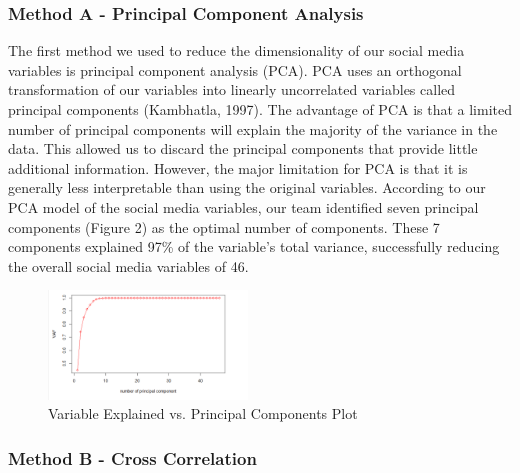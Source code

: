 \documentclass[12pt,oneside]{chicagocapstone}
\begin{document}
\hypertarget{method-a---principal-component-analysis}{%
\subsubsection*{Method A - Principal Component Analysis}\label{method-a---principal-component-analysis}}

The first method we used to reduce the dimensionality of our social media variables is principal component analysis (PCA). PCA uses an orthogonal transformation of our variables into linearly uncorrelated variables called principal components (Kambhatla, 1997). The advantage of PCA is that a limited number of principal components will explain the majority of the variance in the data. This allowed us to discard the principal components that provide little additional information. However, the major limitation for PCA is that it is generally less interpretable than using the original variables.
According to our PCA model of the social media variables, our team identified seven principal components (Figure 2) as the optimal number of components. These 7 components explained 97\% of the variable's total variance, successfully reducing the overall social media variables of 46.
\begin{figure}

{\centering \includegraphics[width=200px,angle = 0, scale=2.1]{figure/pca} 

}

\caption{Variable Explained vs. Principal Components Plot}\label{fig:pca}
\end{figure}
\hypertarget{method-b---cross-correlation}{%
\subsubsection*{Method B - Cross Correlation}\label{method-b---cross-correlation}}
\end{document}
